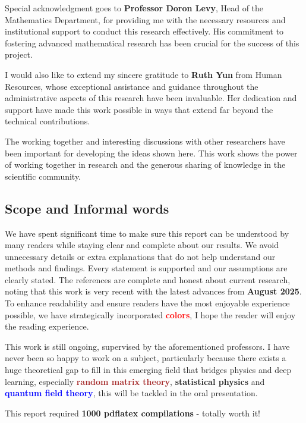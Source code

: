 \documentclass[a4paper]{article}
\theoremstyle{plain}
\theoremstyle{definition}
\theoremstyle{remark}
\begin{document}
Special acknowledgment goes to \textbf{Professor Doron Levy}, Head of the Mathematics Department, for providing me with the necessary resources and institutional support to conduct this research effectively. His commitment to fostering advanced mathematical research has been crucial for the success of this project.

I would also like to extend my sincere gratitude to \textbf{Ruth Yun} from Human Resources, whose exceptional assistance and guidance throughout the administrative aspects of this research have been invaluable. Her dedication and support have made this work possible in ways that extend far beyond the technical contributions.


The working together and interesting discussions with other researchers have been important for developing the ideas shown here. This work shows the power of working together in research and the generous sharing of knowledge in the scientific community.


\subsection*{Scope and Informal words}

We have spent significant time to make sure this report can be understood by many readers while staying clear and complete about our results. We avoid unnecessary details or extra explanations that do not help understand our methods and findings. 
Every statement is supported and our assumptions are clearly stated. The references are complete and honest about current research, 
noting that this work is very recent with the latest advances from \textbf{August 2025}.
To enhance readability and ensure readers have the most enjoyable experience possible, we have strategically 
incorporated \textbf{\textcolor{red}{colors}}, I hope the reader will enjoy the reading experience.

This work is still ongoing, supervised by the aforementioned professors. I have never been so happy to work on a subject,
particularly because there exists a huge theoretical gap to fill in this emerging field that bridges physics and deep learning,
especially \textbf{\textcolor{brown}{random matrix theory}}, \textbf{\textcolor{darkyellow}{statistical physics}} and \textbf{\textcolor{blue}{quantum field theory}}, this will be tackled in the oral presentation.

This report required \textbf{1000 pdflatex compilations} - totally worth it!
\end{document}
